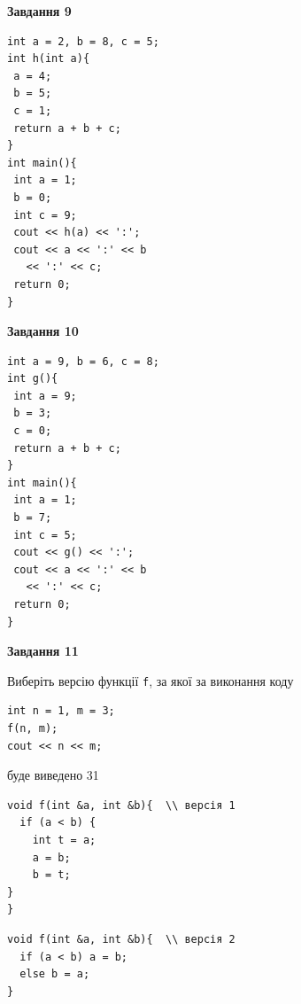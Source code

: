\documentclass[12pt, ukrainian]{article}
\def\code#1{\Verb!#1!}
\begin{document}
{\begin {large}
\begin{minipage}[t]{11.0cm}
\end{minipage}


\begin{minipage}[t]{7.0cm}

\begin{center}
\textbf{Завдання 9}
\end{center}
\vspace{-8mm}

\begin{verbatim}
int a = 2, b = 8, c = 5;
int h(int a){
 a = 4;
 b = 5;
 c = 1;
 return a + b + c;
}
int main(){
 int a = 1;
 b = 0;
 int c = 9;
 cout << h(a) << ':';
 cout << a << ':' << b 
   << ':' << c;
 return 0;
}
\end{verbatim}



\begin{center}
\textbf{Завдання 10}
\end{center}
\vspace{-8mm}

\begin{verbatim}
int a = 9, b = 6, c = 8;
int g(){
 int a = 9;
 b = 3;
 c = 0;
 return a + b + c;
}
int main(){
 int a = 1;
 b = 7;
 int c = 5;
 cout << g() << ':';
 cout << a << ':' << b 
   << ':' << c;
 return 0;
}
\end{verbatim}

\end{minipage}
\vline \hspace{1mm}
\begin{minipage}[t]{11.0cm}

\begin{center}
\textbf{Завдання 11}
\end{center}
Виберіть версію функції \code{f}, за якої за виконання коду
\begin{verbatim}
int n = 1, m = 3;
f(n, m);
cout << n << m;
\end{verbatim}

буде виведено 31

\begin{verbatim}
void f(int &a, int &b){  \\ версія 1
  if (a < b) {
    int t = a;
    a = b;
    b = t;
}  
}
\end{verbatim}

\vspace{-8mm}\begin{verbatim}
void f(int &a, int &b){  \\ версія 2
  if (a < b) a = b;
  else b = a;
}
\end{verbatim}


\end{minipage}
\end{large}}
\end{document}
